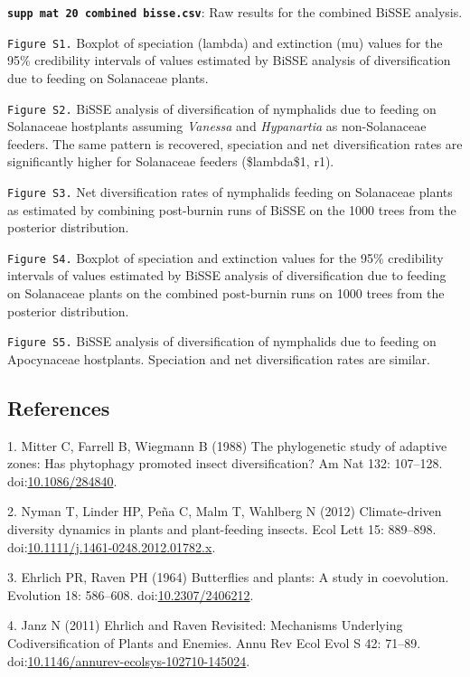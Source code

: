 \documentclass[10pt]{article}
\begin{document}
\textbf{\texttt{supp mat 20 combined bisse.csv}}: Raw results for
the combined BiSSE analysis.

\texttt{Figure S1.} Boxplot of speciation (lambda) and extinction (mu)
values for the 95\% credibility intervals of values estimated by BiSSE
analysis of diversification due to feeding on Solanaceae plants.

\texttt{Figure S2.} BiSSE analysis of diversification of nymphalids due
to feeding on Solanaceae hostplants assuming \emph{Vanessa} and
\emph{Hypanartia} as non-Solanaceae feeders. The same pattern is
recovered, speciation and net diversification rates are significantly
higher for Solanaceae feeders (\$lambda\$1, r1).

\texttt{Figure S3.} Net diversification rates of nymphalids feeding on
Solanaceae plants as estimated by combining post-burnin runs of BiSSE on
the 1000 trees from the posterior distribution.

\texttt{Figure S4.} Boxplot of speciation and extinction values for the
95\% credibility intervals of values estimated by BiSSE analysis of
diversification due to feeding on Solanaceae plants on the combined
post-burnin runs on 1000 trees from the posterior distribution.

\texttt{Figure S5.} BiSSE analysis of diversification of nymphalids due
to feeding on Apocynaceae hostplants. Speciation and net diversification
rates are similar.

\subsection*{References}\label{references}

1. Mitter C, Farrell B, Wiegmann B (1988) The phylogenetic study of
adaptive zones: Has phytophagy promoted insect diversification? Am Nat
132: 107--128.
doi:\href{http://dx.doi.org/10.1086/284840}{10.1086/284840}.

2. Nyman T, Linder HP, Peña C, Malm T, Wahlberg N (2012) Climate-driven
diversity dynamics in plants and plant-feeding insects. Ecol Lett 15:
889--898.
doi:\href{http://dx.doi.org/10.1111/j.1461-0248.2012.01782.x}{10.1111/j.1461-0248.2012.01782.x}.

3. Ehrlich PR, Raven PH (1964) Butterflies and plants: A study in
coevolution. Evolution 18: 586--608.
doi:\href{http://dx.doi.org/10.2307/2406212}{10.2307/2406212}.

4. Janz N (2011) Ehrlich and Raven Revisited: Mechanisms Underlying
Codiversification of Plants and Enemies. Annu Rev Ecol Evol S 42:
71--89.
doi:\href{http://dx.doi.org/10.1146/annurev-ecolsys-102710-145024}{10.1146/annurev-ecolsys-102710-145024}.
\end{document}
